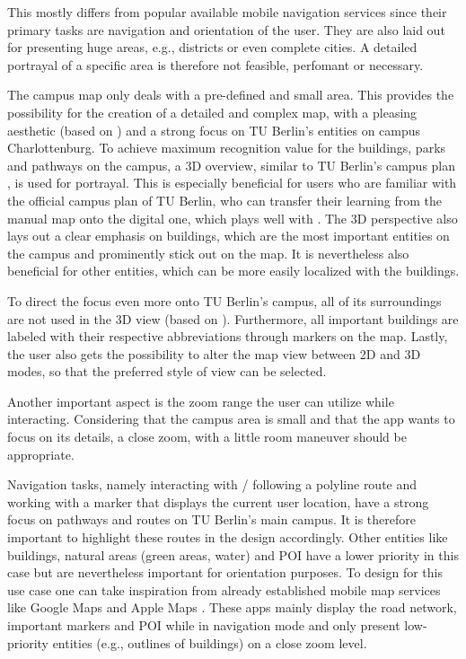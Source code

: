 This mostly differs from popular available mobile navigation services since their primary tasks are navigation and orientation of the user. They are also laid out for presenting huge areas, e.g., districts or even complete cities. A detailed portrayal of a specific area is therefore not feasible, perfomant or necessary.

The campus map only deals with a pre-defined and small area. This provides the possibility for the creation of a detailed and complex map, with a pleasing aesthetic (based on \cite{aesthetic_usability_effect}) and a strong focus on TU Berlin's entities on campus Charlottenburg. To achieve maximum recognition value for the buildings, parks and pathways on the campus, a 3D overview, similar to TU Berlin's campus plan \cite{campus_plan}, is used for portrayal. This is especially beneficial for users who are familiar with the official campus plan of TU Berlin, who can transfer their learning from the manual map onto the digital one, which plays well with \cite{jakobs_law}. The 3D perspective also lays out a clear emphasis on buildings, which are the most important entities on the campus and prominently stick out on the map. It is nevertheless also beneficial for other entities, which can be more easily localized with the buildings.

To direct the focus even more onto TU Berlin's campus, all of its surroundings are not used in the 3D view (based on \cite{law_of_common_region}). Furthermore, all important buildings are labeled with their respective abbreviations through markers on the map. Lastly, the user also gets the possibility to alter the map view between 2D and 3D modes, so that the preferred style of view can be selected.

Another important aspect is the zoom range the user can utilize while interacting. Considering that the campus area is small and that the app wants to focus on its details, a close zoom, with a little room maneuver should be appropriate.

Navigation tasks, namely interacting with / following a polyline route and working with a marker that displays the current user location, have a strong focus on pathways and routes on TU Berlin's main campus. It is therefore important to highlight these routes in the design accordingly. Other entities like buildings, natural areas (green areas, water) and POI have a lower priority in this case but are nevertheless important for orientation purposes. To design for this use case one can take inspiration from already established mobile map services like Google Maps \cite{google_maps_website} and Apple Maps \cite{apple_maps_website}. These apps mainly display the road network, important markers and POI while in navigation mode and only present low-priority entities (e.g., outlines of buildings) on a close zoom level.

